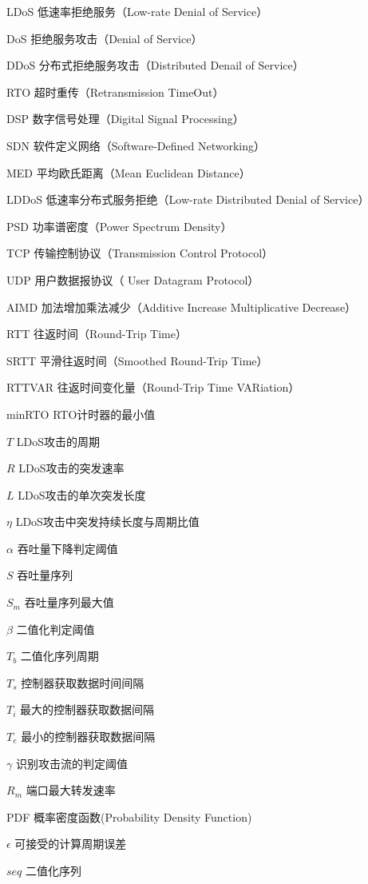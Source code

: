 \begin{denotation}[3cm]
    \item[LDoS] 低速率拒绝服务（Low-rate Denial of Service）
    \item[DoS] 拒绝服务攻击（Denial of Service）
    \item[DDoS] 分布式拒绝服务攻击（Distributed Denail of Service）
    \item[RTO] 超时重传（Retransmission TimeOut）
    \item[DSP] 数字信号处理（Digital Signal Processing）
    \item[SDN] 软件定义网络（Software-Defined Networking）
    \item[MED] 平均欧氏距离（Mean Euclidean Distance）
    \item[LDDoS] 低速率分布式服务拒绝（Low-rate Distributed Denial of Service）
    \item[PSD] 功率谱密度（Power Spectrum Density）
    \item[TCP] 传输控制协议（Transmission Control Protocol）
    \item[UDP] 用户数据报协议（ User Datagram Protocol）
    \item[AIMD] 加法增加乘法减少（Additive Increase Multiplicative Decrease）
    \item[RTT]	往返时间（Round-Trip Time）
    \item[SRTT] 平滑往返时间（Smoothed Round-Trip Time）
    \item[RTTVAR] 往返时间变化量（Round-Trip Time VARiation）
    \item[minRTO] RTO计时器的最小值
    \item[$T$] LDoS攻击的周期
    \item[$R$] LDoS攻击的突发速率
    \item[$L$] LDoS攻击的单次突发长度
    \item[$\eta$] LDoS攻击中突发持续长度与周期比值
    \item[$\alpha$] 吞吐量下降判定阈值
    \item[$S$] 吞吐量序列
    \item[$S_m$] 吞吐量序列最大值
    \item[$\beta$] 二值化判定阈值
    \item[$T_b$] 二值化序列周期
    \item[$T_s$] 控制器获取数据时间间隔
    \item[$T_i$] 最大的控制器获取数据间隔
    \item[$T_e$] 最小的控制器获取数据间隔
    \item[$\gamma$] 识别攻击流的判定阈值
    \item[$R_m$] 端口最大转发速率
    \item[PDF] 概率密度函数(Probability Density Function)
    \item[$\epsilon$] 可接受的计算周期误差
    \item[$seq$] 二值化序列

\end{denotation}



